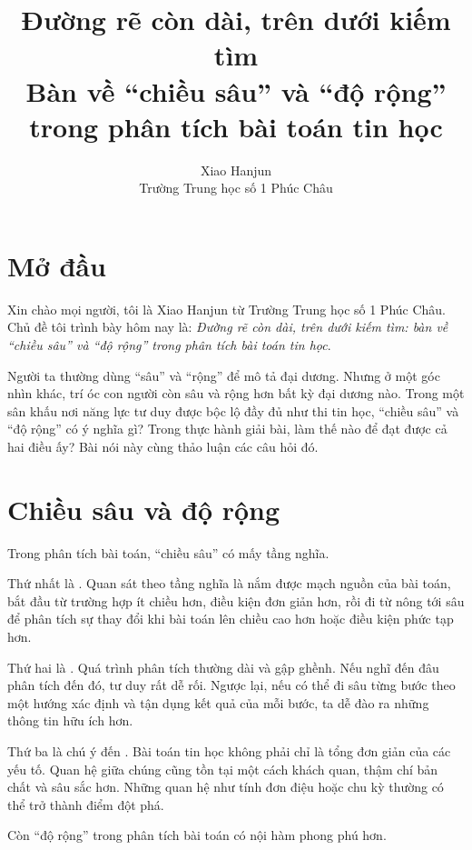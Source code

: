 \documentclass[11pt]{article}
\title{Đường rẽ còn dài, trên dưới kiếm tìm\\{\large Bàn về ``chiều sâu'' và ``độ rộng'' trong phân tích bài toán tin học}}
\author{Xiao Hanjun\\Trường Trung học số 1 Phúc Châu}
\date{}
\begin{document}
\maketitle


\section{Mở đầu}

Xin chào mọi người, tôi là Xiao Hanjun từ Trường Trung học số 1 Phúc Châu.
Chủ đề tôi trình bày hôm nay là: \emph{Đường rẽ còn dài, trên dưới kiếm tìm:
bàn về ``chiều sâu'' và ``độ rộng'' trong phân tích bài toán tin học}.

Người ta thường dùng ``sâu'' và ``rộng'' để mô tả đại dương. Nhưng ở một góc
nhìn khác, trí óc con người còn sâu và rộng hơn bất kỳ đại dương nào. Trong
một sân khấu nơi năng lực tư duy được bộc lộ đầy đủ như thi tin học,
``chiều sâu'' và ``độ rộng'' có ý nghĩa gì? Trong thực hành giải bài, làm thế
nào để đạt được cả hai điều ấy? Bài nói này cùng thảo luận các câu hỏi đó.

\section{Chiều sâu và độ rộng}

Trong phân tích bài toán, ``chiều sâu'' có mấy tầng nghĩa.

Thứ nhất là . Quan sát theo tầng nghĩa là nắm được mạch
nguồn của bài toán, bắt đầu từ trường hợp ít chiều hơn, điều kiện đơn giản
hơn, rồi đi từ nông tới sâu để phân tích sự thay đổi khi bài toán lên chiều
cao hơn hoặc điều kiện phức tạp hơn.

Thứ hai là . Quá trình phân tích thường dài và gập ghềnh.
Nếu nghĩ đến đâu phân tích đến đó, tư duy rất dễ rối. Ngược lại, nếu có thể
đi sâu từng bước theo một hướng xác định và tận dụng kết quả của mỗi bước,
ta dễ đào ra những thông tin hữu ích hơn.

Thứ ba là chú ý đến . Bài toán tin học không
phải chỉ là tổng đơn giản của các yếu tố. Quan hệ giữa chúng cũng tồn tại một
cách khách quan, thậm chí bản chất và sâu sắc hơn. Những quan hệ như tính đơn
điệu hoặc chu kỳ thường có thể trở thành điểm đột phá.

Còn ``độ rộng'' trong phân tích bài toán có nội hàm phong phú hơn.
\end{document}
